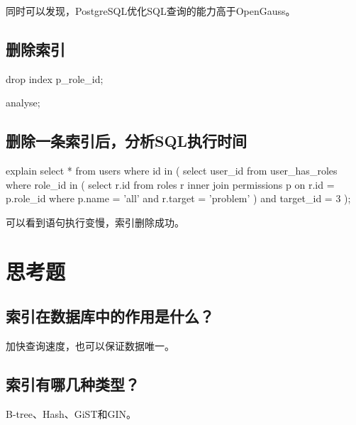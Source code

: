\documentclass{ctexrep}
\begin{document}
同时可以发现，PostgreSQL优化SQL查询的能力高于OpenGauss。

\subsection{删除索引}
\begin{run}
    drop index p_role_id;
\end{run}
\begin{runsilent}
    analyse;
\end{runsilent}
\subsection{删除一条索引后，分析SQL执行时间}
\begin{run}
    explain select * from users where id in (
        select user_id from user_has_roles where role_id in (
            select r.id from roles r 
            inner join permissions p on r.id = p.role_id 
            where p.name = 'all' and r.target = 'problem'
        ) and target_id = 3
    );
\end{run}
可以看到语句执行变慢，索引删除成功。

\section{思考题}
\subsection*{索引在数据库中的作用是什么？}
加快查询速度，也可以保证数据唯一。
\subsection*{索引有哪几种类型？}
B-tree、Hash、GiST和GIN。
\end{document}
